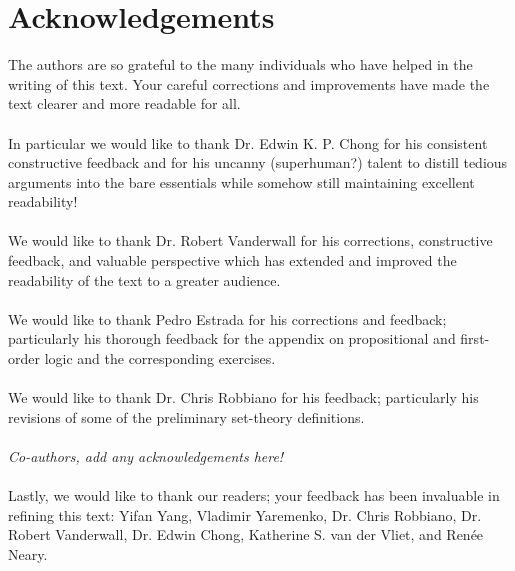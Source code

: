 \section{Acknowledgements}
The authors are so grateful to the many individuals who have helped in the writing of this text. Your careful corrections and improvements have made the text clearer and more readable for all.
 \\ \\
In particular we would like to thank Dr. Edwin K. P. Chong for his consistent constructive feedback and for his uncanny (superhuman?) talent to distill tedious arguments into the bare essentials while somehow still maintaining excellent readability! \\ \\
We would like to thank Dr. Robert Vanderwall for his corrections, constructive feedback, and valuable perspective which has extended and improved the readability of the text to a greater audience. 
\\ \\
We would like to thank Pedro Estrada for his corrections and feedback; particularly his thorough feedback for the appendix on propositional and first-order logic and the corresponding exercises. \\ \\
We would like to thank Dr. Chris Robbiano for his feedback; particularly his revisions of some of the preliminary set-theory definitions. \\ \\
\textit{Co-authors, add any acknowledgements here!} \\ \\

\noindent Lastly, we would like to thank our readers; your feedback has been invaluable in refining this text: Yifan Yang, Vladimir Yaremenko, Dr. Chris Robbiano, Dr. Robert Vanderwall, Dr. Edwin Chong, Katherine S. van der Vliet, and Ren\'{e}e Neary.